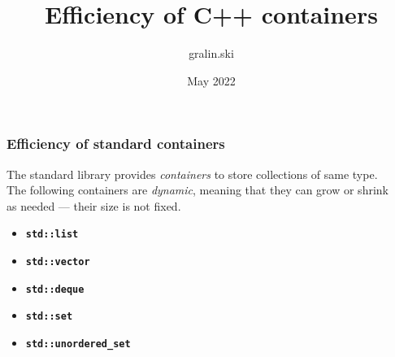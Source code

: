 \documentclass[aspectratio=169]{beamer}
\title[%
\texttt{\textcolor{clGray}{C++ Friends} %
\textcolor{clCodeBlue}{\#20}\textcolor{clGray}{~::~}\textcolor{clCodeBlue}{EfficiencyOfContainers}}%
]{%
Efficiency of C++ containers%
}
\author{gralin.ski}
\date{May 2022}
\newcommand{\greenemph}[1]{\textit{\textcolor{clGreen}{#1}}}
\newcommand{\cpp}[1]{\texttt{\textbf{\textcolor{clCodeBlue}{#1}}}}
\begin{document}
{
\begin{frame}
\end{frame}
}

\begin{frame}
\frametitle{Efficiency of standard containers}
The standard library provides \textit{containers} to store collections of same type.\\
\vspace*{12pt}
The following containers are \greenemph{dynamic}, meaning that they can grow or shrink\\
as needed --- their size is not fixed.
\vspace*{18pt}
\begin{center}
  \begin{minipage}{0.4\textwidth}
    \begin{itemize}
      \item{} \cpp{std::list}
      \item{} \cpp{std::vector}
      \item{} \cpp{std::deque}
      \item{} \cpp{std::set}
      \item{} \cpp{std::unordered\_set}
    \end{itemize}
  \end{minipage}
\end{center}
\end{frame}
\end{document}

